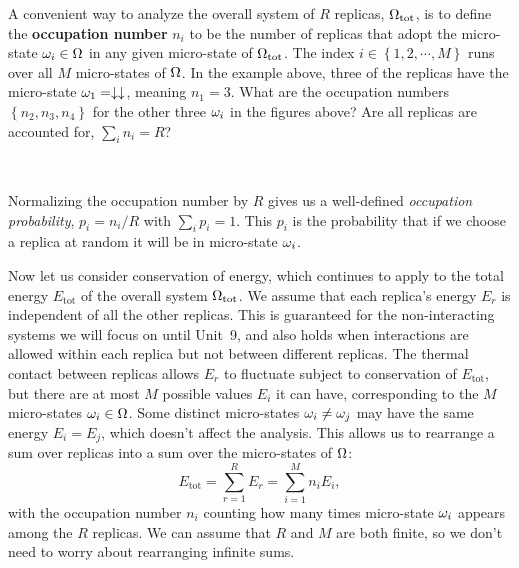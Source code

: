 A convenient way to analyze the overall system of $R$ replicas, $\Omega_{\text{tot}}$, is to define the \textbf{occupation number} $n_i$ to be the number of replicas that adopt the micro-state $\omega_i \in \Omega$ in any given micro-state of $\Omega_{\text{tot}}$.
The index $i \in \left\{1, 2, \cdots, M\right\}$ runs over all $M$ micro-states of $\Omega$.
In the example above, three of the replicas have the micro-state $\omega_1 = \downarrow\downarrow$, meaning $n_1 = 3$.
What are the occupation numbers $\left\{n_2, n_3, n_4\right\}$ for the other three $\omega_i$ in the figures above?
Are all replicas are accounted for, $\sum_i n_i = R$?
\begin{mdframed}
  \ \\[50 pt]
\end{mdframed}
Normalizing the occupation number by $R$ gives us a well-defined \textit{occupation probability}, $p_i = n_i / R$ with $\sum_i p_i = 1$. %
This $p_i$ is the probability that if we choose a replica at random it will be in micro-state $\omega_i$.

Now let us consider conservation of energy, which continues to apply to the total energy $E_{\text{tot}}$ of the overall system $\Omega_{\text{tot}}$.
We assume that each replica's energy $E_r$ is independent of all the other replicas.
This is guaranteed for the non-interacting systems we will focus on until Unit~9, and also holds when interactions are allowed within each replica but not between different replicas.
The thermal contact between replicas allows $E_r$ to fluctuate subject to conservation of $E_{\text{tot}}$, but there are at most $M$ possible values $E_i$ it can have, corresponding to the $M$ micro-states $\omega_i \in \Omega$.
Some distinct micro-states $\omega_i \ne \omega_j$ may have the same energy $E_i = E_j$, which doesn't affect the analysis.
This allows us to rearrange a sum over replicas into a sum over the micro-states of $\Omega$:
\begin{equation}
  \label{eq:canon_Etot}
  E_{\text{tot}} = \sum_{r = 1}^R E_r = \sum_{i = 1}^M n_i E_i,
\end{equation}
with the occupation number $n_i$ counting how many times micro-state $\omega_i$ appears among the $R$ replicas.
We can assume that $R$ and $M$ are both finite, so we don't need to worry about rearranging infinite sums.



